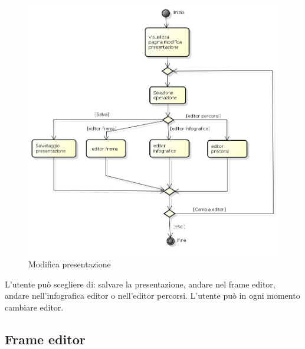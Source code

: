 \begin{figure}[h!]
		\centering
		\includegraphics[scale=.2]{img/Modifica_presentazione.jpg}
		\caption{Modifica presentazione}
		\label{fig:ModelloSpy}
\end{figure}

L'utente può scegliere di: salvare la presentazione, andare nel frame editor, andare nell'infografica editor o nell'editor percorsi.
L'utente può in ogni momento cambiare editor.

\subsection{Frame editor}

